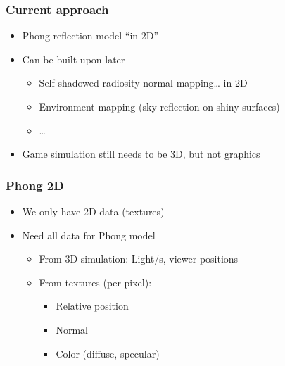 \documentclass{beamer}
\begin{document}
\begin{frame}\frametitle{Current approach}

\begin{itemize}
\item
  Phong reflection model ``in 2D''
\item
  Can be built upon later

  \begin{itemize}
  \item
    Self-shadowed radiosity normal mapping\ldots{} in 2D
  \item
    Environment mapping (sky reflection on shiny surfaces)
  \item
    \ldots{}
  \end{itemize}
\item
  Game simulation still needs to be 3D, but not graphics
\end{itemize}

\end{frame}

\begin{frame}\frametitle{Phong 2D}

\begin{itemize}
\item
  We only have 2D data (textures)
\item
  Need all data for Phong model

  \begin{itemize}
  \item
    From 3D simulation: Light/s, viewer positions
  \item
    From textures (per pixel):

    \begin{itemize}
    \item
      Relative position
    \item
      Normal
    \item
      Color (diffuse, specular)
    \end{itemize}
  \end{itemize}
\end{itemize}

\end{frame}
\end{document}
